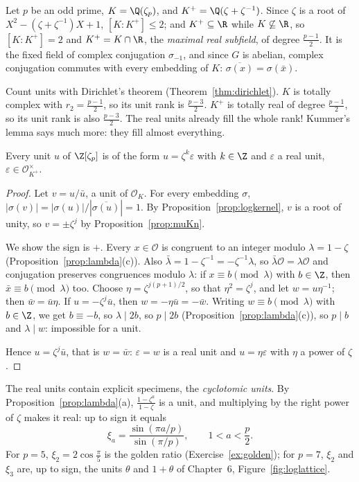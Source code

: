 Let $p$ be an odd prime, $K=\Q(\zeta_p)$, and $K^+=\Q(\zeta+\zeta^{-1})$. Since $\zeta$ is a root of $X^2-(\zeta+\zeta^{-1})X
+1$, $[K:K^+]\le2$; and $K^+\subseteq\R$ while $K\not\subseteq\R$, so $[K:K^+]=2$ and $K^+=K\cap\R$, the \emph{maximal real
subfield}, of degree $\frac{p-1}2$. It is the fixed field of complex conjugation $\sigma_{-1}$, and since $G$ is abelian,
complex conjugation commutes with every embedding of $K$: $\overline{\sigma(x)}=\sigma(\bar x)$.

Count units with Dirichlet's theorem (Theorem~\ref{thm:dirichlet}). $K$ is totally complex with $r_2=\frac{p-1}2$, so its unit
rank is $\frac{p-3}2$. $K^+$ is totally real of degree $\frac{p-1}2$, so its unit rank is also $\frac{p-3}2$. The real units
already fill the whole rank! Kummer's lemma says much more: they fill almost everything.

\begin{theorem}\label{thm:kummerlemma}
Every unit $u$ of $\Z[\zeta_p]$ is of the form $u=\zeta^k\varepsilon$ with $k\in\Z$ and $\varepsilon$ a real unit, $\varepsilon\in
\mathcal O_{K^+}^\times$.
\end{theorem}
\begin{proof}
Let $v=u/\bar u$, a unit of $\mathcal O_K$. For every embedding $\sigma$, $|\sigma(v)|=|\sigma(u)|/|\overline{\sigma(u)}|=1$.
By Proposition~\ref{prop:logkernel}, $v$ is a root of unity, so $v=\pm\zeta^j$ by Proposition~\ref{prop:muKn}.

We show the sign is $+$. Every $x\in\mathcal O$ is congruent to an integer modulo $\lambda=1-\zeta$
(Proposition~\ref{prop:lambda}(c)). Also $\bar\lambda=1-\zeta^{-1}=-\zeta^{-1}\lambda$, so $\bar\lambda\mathcal O=\lambda\mathcal
O$ and conjugation preserves congruences modulo $\lambda$: if $x\equiv b\pmod\lambda$ with $b\in\Z$, then $\bar x\equiv b
\pmod\lambda$ too. Choose $\eta=\zeta^{j(p+1)/2}$, so that $\eta^2=\zeta^j$, and let $w=u\eta^{-1}$; then $\bar w=\bar u\eta$. If
$u=-\zeta^j\bar u$, then $w=-\eta\bar u=-\bar w$. Writing $w\equiv b\pmod\lambda$ with $b\in\Z$, we get $b\equiv-b$, so
$\lambda\mid2b$, so $p\mid 2b$ (Proposition~\ref{prop:lambda}(c)), so $p\mid b$ and $\lambda\mid w$: impossible for a unit.

Hence $u=\zeta^j\bar u$, that is $w=\bar w$: $\varepsilon=w$ is a real unit and $u=\eta\varepsilon$ with $\eta$ a power of
$\zeta$.
\end{proof}

The real units contain explicit specimens, the \emph{cyclotomic units}. By Proposition~\ref{prop:lambda}(a),
$\frac{1-\zeta^a}{1-\zeta}$ is a unit, and multiplying by the right power of $\zeta$ makes it real: up to sign it equals
\[
\xi_a=\frac{\sin(\pi a/p)}{\sin(\pi/p)},\qquad 1<a<\frac p2.
\]
For $p=5$, $\xi_2=2\cos\frac\pi5$ is the golden ratio (Exercise~\ref{ex:golden}); for $p=7$, $\xi_2$ and $\xi_3$ are, up to sign,
the units $\theta$ and $1+\theta$ of Chapter~6, Figure~\ref{fig:loglattice}.

